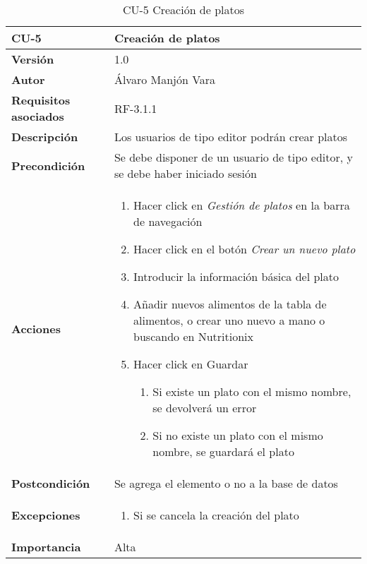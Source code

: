 \begin{table}[htp]
	\centering
	\begin{tabularx}{\linewidth}{ p{} p{} }
		\toprule
		\textbf{CU-5}    & \textbf{Creación de platos}\\
		\toprule
		\textbf{Versión}              & 1.0    \\
		\textbf{Autor}                & Álvaro Manjón Vara \\
		\textbf{Requisitos asociados} & RF-3.1.1 \\
		\textbf{Descripción}          & Los usuarios de tipo editor podrán crear platos \\
		\textbf{Precondición}         & Se debe disponer de un usuario de tipo editor, y se debe haber iniciado sesión \\
		\textbf{Acciones}             &
		\begin{enumerate}
			\def\labelenumi{\arabic{enumi}.}
			\tightlist
			\item Hacer click en \textit{Gestión de platos} en la barra de navegación
			\item Hacer click en el botón \textit{Crear un nuevo plato}
			\item Introducir la información básica del plato
			\item Añadir nuevos alimentos de la tabla de alimentos, o crear uno nuevo a mano o buscando en Nutritionix
			\item Hacer click en Guardar
			\begin{enumerate}
				\item Si existe un plato con el mismo nombre, se devolverá un error
				\item Si no existe un plato con el mismo nombre, se guardará el plato
			\end{enumerate}
		\end{enumerate}\\
		\textbf{Postcondición}        & Se agrega el elemento o no a la base de datos \\
		\textbf{Excepciones}          & \begin{enumerate}
  \item Si se cancela la creación del plato
\end{enumerate}
 \\
		\textbf{Importancia}          & Alta \\
		\bottomrule
	\end{tabularx}
	\caption{CU-5 Creación de platos}
\end{table}
\afterpage{\clearpage}

